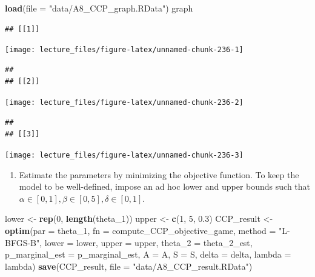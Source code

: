 \documentclass[]{book}
\newenvironment{Shaded}{\begin{snugshade}}{\end{snugshade}}
\newcommand{\KeywordTok}[1]{\textcolor[rgb]{0.13,0.29,0.53}{\textbf{#1}}}
\newcommand{\DataTypeTok}[1]{\textcolor[rgb]{0.13,0.29,0.53}{#1}}
\newcommand{\DecValTok}[1]{\textcolor[rgb]{0.00,0.00,0.81}{#1}}
\newcommand{\FloatTok}[1]{\textcolor[rgb]{0.00,0.00,0.81}{#1}}
\newcommand{\StringTok}[1]{\textcolor[rgb]{0.31,0.60,0.02}{#1}}
\newcommand{\NormalTok}[1]{#1}
\providecommand{\tightlist}{%
  \setlength{\itemsep}{0pt}\setlength{\parskip}{0pt}}
\begin{document}
\begin{Shaded}
\begin{Highlighting}[]
\KeywordTok{load}\NormalTok{(}\DataTypeTok{file =} \StringTok{"data/A8_CCP_graph.RData"}\NormalTok{)}
\NormalTok{graph}
\end{Highlighting}
\end{Shaded}

\begin{verbatim}
## [[1]]
\end{verbatim}

\begin{center}\texttt{[image: lecture\_files/figure-latex/unnamed-chunk-236-1]} \end{center}

\begin{verbatim}
## 
## [[2]]
\end{verbatim}

\begin{center}\texttt{[image: lecture\_files/figure-latex/unnamed-chunk-236-2]} \end{center}

\begin{verbatim}
## 
## [[3]]
\end{verbatim}

\begin{center}\texttt{[image: lecture\_files/figure-latex/unnamed-chunk-236-3]} \end{center}

\begin{enumerate}
\def\labelenumi{\arabic{enumi}.}
\setcounter{enumi}{3}
\tightlist
\item
  Estimate the parameters by minimizing the objective function. To keep
  the model to be well-defined, impose an ad hoc lower and upper bounds
  such that \(\alpha \in [0, 1], \beta \in [0, 5], \delta \in [0, 1]\).
\end{enumerate}

\begin{Shaded}
\begin{Highlighting}[]
\NormalTok{lower <-}\StringTok{ }\KeywordTok{rep}\NormalTok{(}\DecValTok{0}\NormalTok{, }\KeywordTok{length}\NormalTok{(theta_}\DecValTok{1}\NormalTok{))}
\NormalTok{upper <-}\StringTok{ }\KeywordTok{c}\NormalTok{(}\DecValTok{1}\NormalTok{, }\DecValTok{5}\NormalTok{, }\FloatTok{0.3}\NormalTok{)}
\NormalTok{CCP_result <-}
\StringTok{  }\KeywordTok{optim}\NormalTok{(}\DataTypeTok{par =}\NormalTok{ theta_}\DecValTok{1}\NormalTok{,}
        \DataTypeTok{fn =}\NormalTok{ compute_CCP_objective_game,}
        \DataTypeTok{method =} \StringTok{"L-BFGS-B"}\NormalTok{,}
        \DataTypeTok{lower =}\NormalTok{ lower,}
        \DataTypeTok{upper =}\NormalTok{ upper,}
        \DataTypeTok{theta_2 =}\NormalTok{ theta_2_est,}
        \DataTypeTok{p_marginal_est =}\NormalTok{ p_marginal_est,}
        \DataTypeTok{A =}\NormalTok{ A,}
        \DataTypeTok{S =}\NormalTok{ S,}
        \DataTypeTok{delta =}\NormalTok{ delta,}
        \DataTypeTok{lambda =}\NormalTok{ lambda)}
\KeywordTok{save}\NormalTok{(CCP_result, }\DataTypeTok{file =} \StringTok{"data/A8_CCP_result.RData"}\NormalTok{)}
\end{Highlighting}
\end{Shaded}
\end{document}
